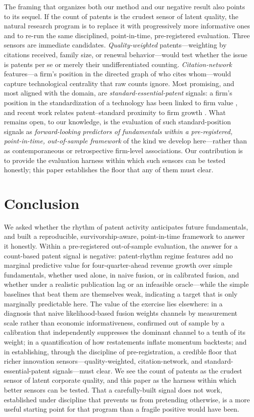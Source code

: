 \documentclass[11pt]{article}
\begin{document}
The framing that organizes both our method and our negative result also points to its sequel. If the count of patents is the crudest sensor of latent quality, the natural research program is to replace it with progressively more informative ones and to re-run the same disciplined, point-in-time, pre-registered evaluation. Three sensors are immediate candidates. \emph{Quality-weighted} patents---weighting by citations received, family size, or renewal behavior---would test whether the issue is patents per se or merely their undifferentiated counting. \emph{Citation-network} features---a firm's position in the directed graph of who cites whom---would capture technological centrality that raw counts ignore. Most promising, and most aligned with the domain, are \emph{standard-essential-patent} signals: a firm's position in the standardization of a technology has been linked to firm value \citep{hussinger2015,baron2016}, and recent work relates patent--standard proximity to firm growth \citep{bergeaud2022}. What remains open, to our knowledge, is the evaluation of such standard-position signals as \emph{forward-looking predictors of fundamentals within a pre-registered, point-in-time, out-of-sample framework} of the kind we develop here---rather than as contemporaneous or retrospective firm-level associations. Our contribution is to provide the evaluation harness within which such sensors can be tested honestly; this paper establishes the floor that any of them must clear.

\section{Conclusion}

We asked whether the rhythm of patent activity anticipates future fundamentals, and built a reproducible, survivorship-aware, point-in-time framework to answer it honestly. Within a pre-registered out-of-sample evaluation, the answer for a count-based patent signal is negative: patent-rhythm regime features add no marginal predictive value for four-quarter-ahead revenue growth over simple fundamentals, whether used alone, in naive fusion, or in calibrated fusion, and whether under a realistic publication lag or an infeasible oracle---while the simple baselines that beat them are themselves weak, indicating a target that is only marginally predictable here. The value of the exercise lies elsewhere: in a diagnosis that naive likelihood-based fusion weights channels by measurement scale rather than economic informativeness, confirmed out of sample by a calibration that independently suppresses the dominant channel to a tenth of its weight; in a quantification of how restatements inflate momentum backtests; and in establishing, through the discipline of pre-registration, a credible floor that richer innovation sensors---quality-weighted, citation-network, and standard-essential-patent signals---must clear. We see the count of patents as the crudest sensor of latent corporate quality, and this paper as the harness within which better sensors can be tested. That a carefully-built signal does not work, established under discipline that prevents us from pretending otherwise, is a more useful starting point for that program than a fragile positive would have been.
\end{document}
